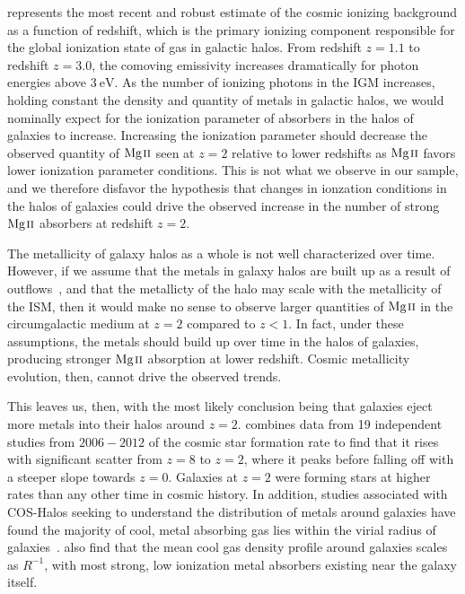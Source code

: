\documentclass[iop,apj,numberedappendix,appendixfloats,twocolappendix]{emulateapj}
\begin{document}
\cite{Haardt2012} represents the most recent and robust estimate of the cosmic ionizing background as a function of redshift, which is the primary ionizing component responsible for the global ionization state of gas in galactic halos. From redshift $z = 1.1$ to redshift $z = 3.0$, the comoving emissivity increases dramatically for photon energies above $3~\mathrm{eV}$. As the number of ionizing photons in the IGM increases, holding constant the density and quantity of metals in galactic halos, we would nominally expect for the ionization parameter of absorbers in the halos of galaxies to increase. Increasing the ionization parameter should decrease the observed quantity of ${\hbox{{\rm Mg}\kern 0.1em{\sc ii}}}$ seen at $z = 2$ relative to lower redshifts as ${\hbox{{\rm Mg}\kern 0.1em{\sc ii}}}$ favors lower ionization parameter conditions. This is not what we observe in our sample, and we therefore disfavor the hypothesis that changes in ionzation conditions in the halos of galaxies could drive the observed increase in the number of strong ${\hbox{{\rm Mg}\kern 0.1em{\sc ii}}}$ absorbers at redshift $z = 2$. 

The metallicity of galaxy halos as a whole is not well characterized over time. However, if we assume that the metals in galaxy halos are built up as a result of outflows~\citep{Quiret2016}, and that the metallicty of the halo may scale with the metallicity of the ISM, then it would make no sense to observe larger quantities of ${\hbox{{\rm Mg}\kern 0.1em{\sc ii}}}$ in the circumgalactic medium at $z = 2$ compared to $z < 1$. In fact, under these assumptions, the metals should build up over time in the halos of galaxies, producing stronger ${\hbox{{\rm Mg}\kern 0.1em{\sc ii}}}$ absorption at lower redshift. Cosmic metallicity evolution, then, cannot drive the observed trends.

This leaves us, then, with the most likely conclusion being that galaxies eject more metals into their halos around $z = 2$. \cite{Behroozi2013sfr} combines data from 19 independent studies from $2006-2012$ of the cosmic star formation rate to find that it rises with significant scatter from $z=8$ to $z=2$, where it peaks before falling off with a steeper slope towards $z = 0$. Galaxies at $z=2$ were forming stars at higher rates than any other time in cosmic history. In addition, studies associated with COS-Halos seeking to understand the distribution of metals around galaxies have found the majority of cool, metal absorbing gas lies within the virial radius of galaxies~\citep{Peeples2014}. \cite{Stern2016} also find that the mean cool gas density profile around galaxies scales as $R^{-1}$, with most strong, low ionization metal absorbers existing near the galaxy itself. 
\end{document}
